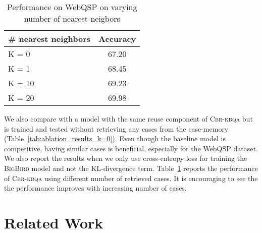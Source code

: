 \documentclass[11pt]{article}
\newcommand{\bigb}{\textsc{BigBird}\xspace}
\newcommand{\alg}{\textsc{Cbr-kbqa}\xspace}
\begin{document}
\begin{table}[]
\vspace{-3.5mm}
    \centering
    \small
    \begin{tabular}{l c}\toprule
       \# nearest neighbors  &  Accuracy \\\midrule
    K = 0 & 67.20 \\
    K = 1 & 68.45 \\
    K = 10 & 69.23\\
    K = 20 & 69.98\\\bottomrule
    \end{tabular}
    \caption{Performance on WebQSP on varying number of nearest neigbors}
    \vspace{-6mm}
    \label{tab:appendix_vary_k}
\end{table}

We also compare with a model with the same reuse component of \alg but is trained and tested without retrieving any cases from the case-memory (Table~\ref{tab:ablation_results_k=0}). Even though the baseline model is competitive, having similar cases is beneficial, especially for the WebQSP dataset. We also report the results when we only use cross-entropy loss for training the \bigb model and not the KL-divergence term. Table~\ref{tab:appendix_vary_k} reports the performance of \alg using different number of retrieved cases. It is encouraging to see the the performance improves with increasing number of cases.


 

\section{Related Work}
\vspace{-2mm}
\label{sec:related_work}
\end{document}
